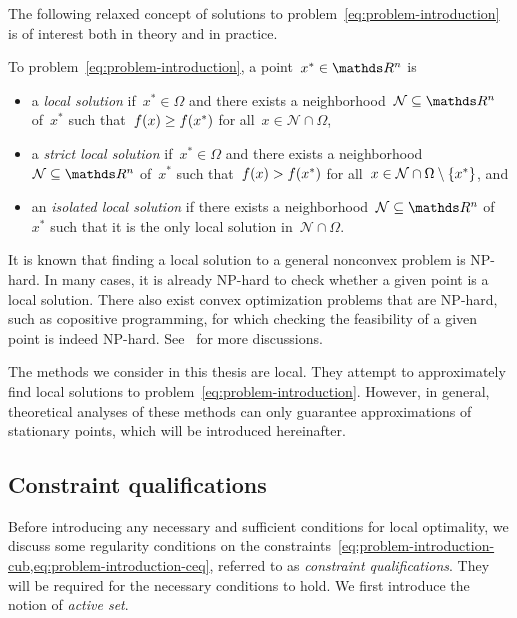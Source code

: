 The following relaxed concept of solutions to problem~\cref{eq:problem-introduction} is of interest both in theory and in practice.

\begin{definition}
    To problem~\cref{eq:problem-introduction}, a point~$x^{\ast} \in \R^n$ is
    \begin{itemize}
        \item a \emph{local solution} if~$x^{\ast} \in \Omega$ and there exists a neighborhood~$\mathcal{N} \subseteq \R^n$ of~$x^{\ast}$ such that~$f(x) \ge f(x^{\ast})$ for all~$x \in \mathcal{N} \cap \Omega$,
        \item a \emph{strict local solution} if~$x^{\ast} \in \Omega$ and there exists a neighborhood~$\mathcal{N} \subseteq \R^n$ of~$x^{\ast}$ such that~$f(x) > f(x^{\ast})$ for all~$x \in \mathcal{N} \cap \Omega \setminus \{x^{\ast}\}$, and
        \item an \emph{isolated local solution} if there exists a neighborhood~$\mathcal{N} \subseteq \R^n$ of~$x^{\ast}$ such that it is the only local solution in~$\mathcal{N} \cap \Omega$.
    \end{itemize}
\end{definition}

It is known that finding a local solution to a general nonconvex problem is NP-hard.
In many cases, it is already NP-hard to check whether a given point is a local solution.
There also exist convex optimization problems that are NP-hard, such as copositive programming, for which checking the feasibility of a given point is indeed NP-hard.
See~\cite{Murty_Kabadi_1987} for more discussions.

The methods we consider in this thesis are local.
They attempt to approximately find local solutions to problem~\cref{eq:problem-introduction}.
However, in general, theoretical analyses of these methods can only guarantee approximations of stationary points, which will be introduced hereinafter.

\subsection{Constraint qualifications}

Before introducing any necessary and sufficient conditions for local optimality, we discuss some regularity conditions on the constraints~\cref{eq:problem-introduction-cub,eq:problem-introduction-ceq}, referred to as \emph{constraint qualifications}.
They will be required for the necessary conditions to hold.
We first introduce the notion of \emph{active set}.

